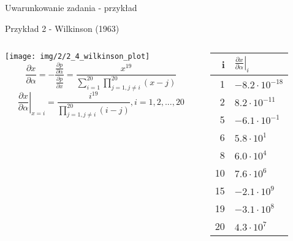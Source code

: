 \begin{frame}{Uwarunkowanie zadania - przykład}
	\begin{exampleblock}{Przykład 2 - Wilkinson (1963)}
    \begin{columns}
    	\begin{column}{.6\linewidth}
          \centering \texttt{[image: img/2/2\_4\_wilkinson\_plot]}
          \[
              \frac{
                  \partial x
              }{
                  \partial \alpha
              } = - \frac{
                  \frac{\partial p}{\partial \alpha}
              }{
                 \frac{\partial p}{\partial x}
              } =  \frac{
                  x^{19}
              }{
                  \sum_{i=1}^{20} \prod_{j=1, j \neq i}^{20} (x-j)
              }
          \]
          \[ 
              \left.
                  \frac{\partial x}{\partial \alpha}
              \right|_{x=i} = \frac{
                  i^{19}
              }{
                  \prod_{j=1, j \neq i}^{20}(i-j)
              }, i = 1, 2, ..., 20
          \]
    	\end{column}
        \begin{column}{.3\linewidth}
          \begin{tabular}{r | l}
              i & $\left.
                  \frac{\partial x}{\partial \alpha}
              \right|_i$ \\
              \hline
               1 & $-8.2 \cdot 10^{-18}$ \\
               2 & $ 8.2 \cdot 10^{-11}$ \\
               5 & $-6.1 \cdot 10^{-1}$  \\
               6 & $ 5.8 \cdot 10^{1}$   \\
               8 & $ 6.0 \cdot 10^{4}$   \\
              10 & $ 7.6 \cdot 10^{6}$   \\
              15 & $-2.1 \cdot 10^{9}$   \\
              19 & $-3.1 \cdot 10^{8}$   \\
              20 & $ 4.3 \cdot 10^{7}$   \\
          \end{tabular}
        \end{column}
    \end{columns}
    \end{exampleblock}
\end{frame}
